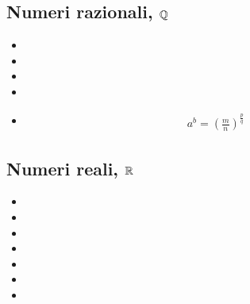 \documentclass[letterpaper,10pt,italian]{jupyterBook}
\begin{document}
\subsection{Numeri razionali, \protect\(\mathbb{Q}\protect\)}
\label{\detokenize{ch/set:numeri-razionali-mathbb-q}}\label{\detokenize{ch/set:math-hs-set-numbers-q}}\begin{itemize}
\item {} 
\sphinxAtStartPar
{}

\item {} 
\sphinxAtStartPar
{}

\item {} 
\sphinxAtStartPar
{}

\item {} 
\sphinxAtStartPar
{}

\item {} 
\sphinxAtStartPar
{}
\begin{equation*}
\begin{split}a^b = \left( \frac{m}{n} \right)^{\frac{p}{q}}\end{split}
\end{equation*}
\end{itemize}


\subsection{Numeri reali, \protect\(\mathbb{R}\protect\)}
\label{\detokenize{ch/set:numeri-reali-mathbb-r}}\label{\detokenize{ch/set:math-hs-set-numbers-r}}\begin{itemize}
\item {} 
\sphinxAtStartPar
{}

\item {} 
\sphinxAtStartPar
{}

\item {} 
\sphinxAtStartPar
{}

\item {} 
\sphinxAtStartPar
{}

\item {} 
\sphinxAtStartPar
{}

\item {} 
\sphinxAtStartPar
{}

\item {} 
\sphinxAtStartPar
{}

\end{itemize}
\end{document}

